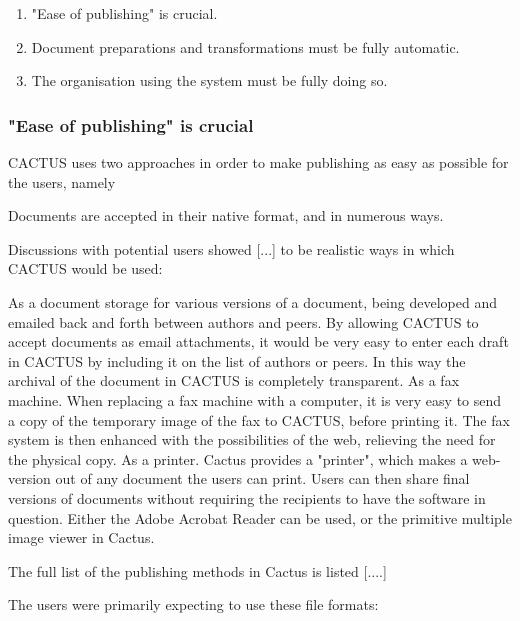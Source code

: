 \begin{enumerate}
\item "Ease of publishing" is crucial.
  
\item Document preparations and transformations must be fully
  automatic.
  
\item The organisation using the system must be fully doing so.

\end{enumerate}

\subsubsection{"Ease of publishing" is crucial}

CACTUS uses two approaches in order to make publishing as easy as
possible for the users, namely

\begin{center}
  Documents are accepted in their native format, and in numerous ways.
\end{center}

Discussions with potential users showed [...] to be realistic ways in
which CACTUS would be used:

As a document storage for various versions of a document, being
developed and emailed back and forth between authors and peers.  By
allowing CACTUS to accept documents as email attachments, it would be
very easy to enter each draft in CACTUS by including it on the list of
authors or peers.  In this way the archival of the document in CACTUS
is completely transparent.  As a fax machine.  When replacing a fax
machine with a computer, it is very easy to send a copy of the
temporary image of the fax to CACTUS, before printing it.  The fax
system is then enhanced with the possibilities of the web, relieving
the need for the physical copy.  As a printer.  Cactus provides a
"printer", which makes a web-version out of any document the users can
print.  Users can then share final versions of documents without
requiring the recipients to have the software in question.  Either the
Adobe Acrobat Reader can be used, or the primitive multiple image
viewer in Cactus.

The full list of the publishing methods in Cactus is listed [....]

The users were primarily expecting to use these file formats:

